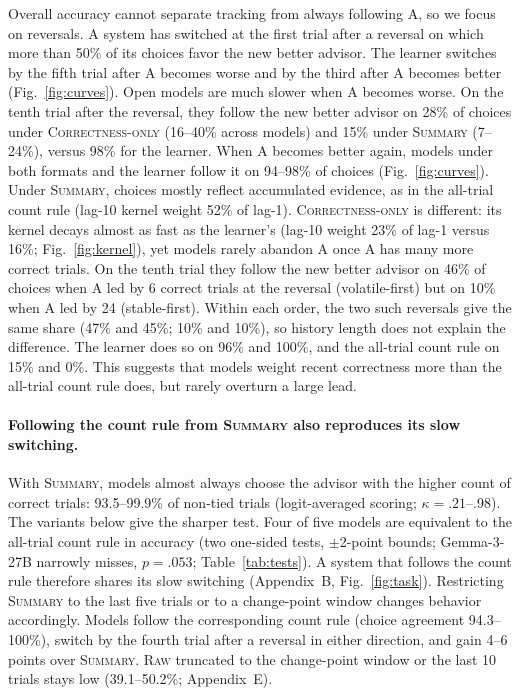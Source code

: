 \documentclass[letterpaper]{article} %
\newcommand{\Raw}{\textsc{Raw}}
\newcommand{\CorrectnessOnly}{\textsc{Correctness-only}}
\newcommand{\Summary}{\textsc{Summary}}
\begin{document}
Overall accuracy cannot separate tracking from always following A, so we focus on reversals. A system has switched at the first trial after a reversal on which more than 50\% of its choices favor the new better advisor. The learner switches by the fifth trial after A becomes worse and by the third after A becomes better (Fig.~\ref{fig:curves}). Open models are much slower when A becomes worse. On the tenth trial after the reversal, they follow the new better advisor on 28\% of choices under \CorrectnessOnly{} (16--40\% across models) and 15\% under \Summary{} (7--24\%), versus 98\% for the learner. When A becomes better again, models under both formats and the learner follow it on 94--98\% of choices (Fig.~\ref{fig:curves}). Under \Summary{}, choices mostly reflect accumulated evidence, as in the all-trial count rule (lag-10 kernel weight 52\% of lag-1). \CorrectnessOnly{} is different: its kernel decays almost as fast as the learner's (lag-10 weight 23\% of lag-1 versus 16\%; Fig.~\ref{fig:kernel}), yet models rarely abandon A once A has many more correct trials. On the tenth trial they follow the new better advisor on 46\% of choices when A led by 6 correct trials at the reversal (volatile-first) but on 10\% when A led by 24 (stable-first). Within each order, the two such reversals give the same share (47\% and 45\%; 10\% and 10\%), so history length does not explain the difference. The learner does so on 96\% and 100\%, and the all-trial count rule on 15\% and 0\%. This suggests that models weight recent correctness more than the all-trial count rule does, but rarely overturn a large lead.

\paragraph{Following the count rule from \Summary{} also reproduces its slow switching.} With \Summary{}, models almost always choose the advisor with the higher count of correct trials: 93.5--99.9\% of non-tied trials (logit-averaged scoring; $\kappa=.21$--.98). The variants below give the sharper test. Four of five models are equivalent to the all-trial count rule in accuracy (two one-sided tests, $\pm$2-point bounds; Gemma-3-27B narrowly misses, $p=.053$; Table~\ref{tab:tests}). A system that follows the count rule therefore shares its slow switching (Appendix~B, Fig.~\ref{fig:task}). Restricting \Summary{} to the last five trials or to a change-point window changes behavior accordingly. Models follow the corresponding count rule (choice agreement 94.3--100\%), switch by the fourth trial after a reversal in either direction, and gain 4--6 points over \Summary{}. \Raw{} truncated to the change-point window or the last 10 trials stays low (39.1--50.2\%; Appendix~E).
\end{document}
